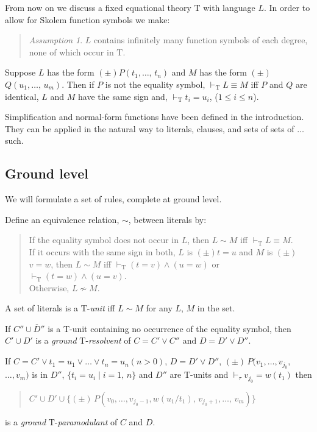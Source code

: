 \documentclass[letterpaper]{report}
\begin{document}
From now on we discuss a fixed equational theory $\mathrm{T}$ with
language $L$. In order to allow for Skolem function symbols we make:
\begin{quote}
\emph{Assumption 1}. $L$ contains infinitely many function symbols of
each degree, none of which occur in $\mathrm{T}$.
\end{quote}

Suppose $L$ has the form $(\pm)$$P(t_{1}, \ldots,\,t_{n})$ and
$M$ has the form $(\pm)$$Q(u_{1}, \ldots,\,u_{m})$. Then if $P$
is not the equality symbol, $\vdash_{\mathrm{T}}L \equiv M$ iff
$P$ and $Q$ are identical, $L$ and $M$ have the same sign and,
$\vdash_{\mathrm{T}}t_{i} = u_{i}$,
($1 \leqslant i \leqslant n$).

Simplification and normal-form functions have been defined in the
introduction. They can be applied in the natural way to literals,
clauses, and sets of sets of $\ldots$ such.

\subsection*{Ground level}\label{ground-level}

We will formulate a set of rules, complete at ground level.

Define an equivalence relation, $\sim$, between literals by:
\begin{quote}
If the equality symbol does not occur in $L$, then $L \sim M$ iff
$\vdash_{\mathrm{T}}L \equiv M$.\\
If it occurs with the same sign in both, $L$ is $(\pm)$$t = u$ and
$M$ is $(\pm)$$v = w$, then $L \sim M$ iff
$\vdash_{\mathrm{T}}(t = v)\wedge(u = w)$ or
$\vdash_{\mathrm{T}}(t = w)\wedge(u = v)$.\\
Otherwise, $L \nsim M$.
\end{quote}

A set of literals is a $\mathrm{T}$-\emph{unit} iff $L \sim M$ for any $L$,
$M$ in the set.

If $C''\cup\overline{D}''$ is a $\mathrm{T}$-unit
containing no occurrence of the equality symbol, then
$C'\cup D'$ is a \emph{ground} $\mathrm{T}$-\emph{resolvent} of
$C = C'\lor C''$ and
$D = D'\lor D''$.

If
$C = C'\lor t_{1} = u_{1}\vee\ldots\lor t_{n} = u_{n}(n > 0)$,
$D=D'\lor D''$,
$(\pm)\,P(v_{1},\ldots,v_{j_{0}},$$\ldots,v_{m})$ is in
$D''$, $\{t_{i} = u_{i}\mid i=1,\,n\}$ and
$D''$ are $\mathrm{T}$-units and
$\vdash_{\tau}v_{j_{0}} = w(t_{1})$ then
\begin{quote}
$C'\cup D'\cup\{(\pm)\,P(v_{0},\ldots,v_{j_{0}-1},w(u_{1}/t_{1}),\,v_{j_{0}+1},\ldots,\,v_{m})\}$
\end{quote}
is a \emph{ground} $\mathrm{T}$-\emph{paramodulant} of $C$ and $D$.
\end{document}
